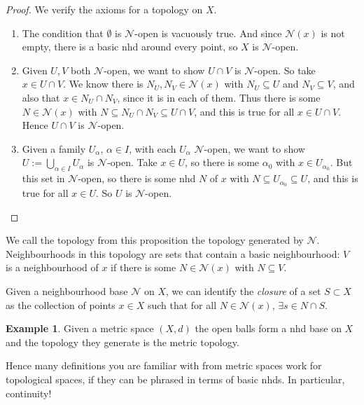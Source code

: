 \documentclass{tufte-handout}
\def\cN {\mathcal{N}}
\theoremstyle{definition}
\newtheorem{example}{Example}
\begin{document}
\begin{proof} 
We verify the axioms for a topology on $X$. 

\begin{enumerate}

\item The condition that $\emptyset$ is $\cN$-open is vacuously true. And since $\cN(x)$ is 
not empty, there is a basic nhd around every point, so $X$ is $\cN$-open.

\item Given $U,V$ both $\cN$-open, we want to show $U\cap V$ is $\cN$-open. So take $x\in 
U\cap V$. We know there is $N_U,N_V \in \cN(x)$ with $N_U \subseteq U$ and $N_V \subseteq 
V$, and also that $x\in N_U \cap N_V$, since it is in each of them. Thus there is some $N\in 
\cN(x)$ with $N \subseteq N_U \cap N_V \subseteq U\cap V$, and this is true for all $x\in 
U\cap V$. Hence $U\cap V$ is $\cN$-open.

\item Given a family $U_\alpha$, $\alpha\in I$, with each $U_\alpha$ $\cN$-open, we want to 
show $U := \bigcup_{\alpha\in I}U_\alpha$ is $\cN$-open. Take $x\in U$, so there is some 
$\alpha_0$ with $x\in U_{\alpha_0}$. But this set in $\cN$-open, so there is some nhd $N$ of 
$x$ with $N\subseteq U_{\alpha_0} \subseteq U$, and this is true for all $x\in U$. So $U$ is 
$\cN$-open. \qedhere

\end{enumerate} 
\end{proof}

We call the topology from this proposition the topology generated by $\cN$. Neighbourhoods 
in this topology are sets that contain a basic neighbourhood: $V$ is a neighbourhood of $x$ 
if there is some $N\in \cN(x)$ with $N\subseteq V$.

Given a neighbourhood base $\cN$ on $X$, we can identify the \emph{closure} of a set 
$S \subset X$ as the collection of points $x\in X$ such that for all $N\in \cN(x)$, 
$\exists s\in N\cap S$.


\begin{example} 
Given a metric space $(X,d)$ the open balls form a nhd base on $X$ and the 
topology they generate is the metric topology. 
\end{example}



Hence many definitions you are familiar with from metric spaces work for topological spaces, if 
they can be phrased in terms of basic nhds. In particular, continuity!
\end{document}
